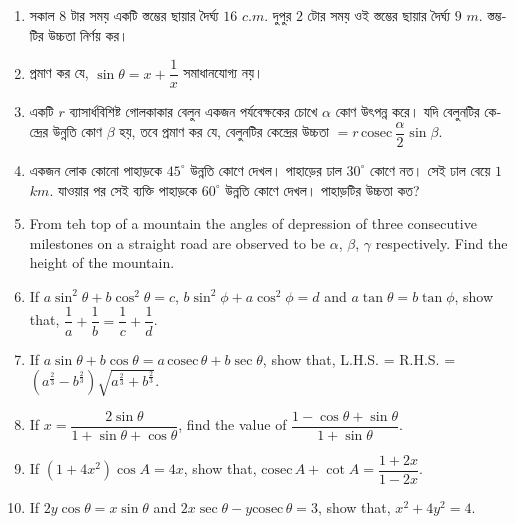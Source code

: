 \documentclass[11pt, a4paper]{article}
\begin{document}
\begin{enumerate}
	\item \textbengali{সকাল} $8$ \textbengali{টার সময় একটি স্তম্ভের ছায়ার দৈর্ঘ্য} $16$ $c.m.$ \textbengali{দুপুর} $2$ \textbengali{টোর সময় ওই স্তম্ভের ছায়ার দৈর্ঘ্য} $9$ $m.$ \textbengali{স্তম্ভটির উচ্চতা নির্ণয় কর।}
	
	\item \textbengali{প্রমাণ কর যে,} $\sin \theta = x + \dfrac{1}{x}$ \textbengali{সমাধানযোগ্য নয়।}
	
	\item \textbengali{একটি} $r$ \textbengali{ব্যাসার্ধবিশিষ্ট গোলকাকার বেলুন একজন পর্যবেক্ষকের চোখে} $\alpha$ \textbengali{কোণ উৎপন্ন করে। যদি বেলুনটির কেন্দ্রের উন্নতি কোণ} $\beta$ \textbengali{হয়, তবে প্রমাণ কর যে, বেলুনটির কেন্দ্রের উচ্চতা} $= r \, \mathrm{cosec\,} \dfrac{\alpha}{2} \sin \beta$.
	
	\item \textbengali{একজন লোক কোনো পাহাড়কে} $45^{\circ}$ \textbengali{উন্নতি কোণে দেখল। পাহাড়ের ঢাল} $30^{\circ}$ \textbengali{কোণে নত। সেই ঢাল বেয়ে} $1$ $km.$ \textbengali{যাওয়ার পর সেই ব্যক্তি পাহাড়কে} $60^{\circ}$ \textbengali{উন্নতি কোণে দেখল। পাহাড়টির উচ্চতা কত?}
	
	\item From teh top of a mountain the angles of depression of three consecutive milestones on a straight road are observed to be $\alpha$, $\beta$, $\gamma$ respectively. Find the height of the mountain.
	
	\item If $a \sin^2 \theta + b \cos^2 \theta = c$, $b \sin^2 \phi + a \cos^2 \phi = d$ and $a \tan \theta = b \tan \phi$, show that, $\dfrac{1}{a} + \dfrac{1}{b} = \dfrac{1}{c} + \dfrac{1}{d}$.
	
	\item If $a\sin \theta + b \cos \theta = a \, \mathrm{cosec}\, \theta + b \sec \theta$, show that, L.H.S. = R.H.S. = $\left( a^{\frac{2}{3}} - b^{\frac{2}{3}} \right) \sqrt{a^{\frac{2}{3}} + b^{\frac{2}{3}}}$.
	
	\item If $x = \dfrac{2 \sin \theta}{1 + \sin \theta + \cos \theta}$, find the value of $\dfrac{1-\cos \theta + \sin \theta}{1 + \sin \theta}$.
	
	\item If $\left( 1 + 4x^2 \right) \cos A = 4x$, show that, $\mathrm{cosec} \, A + \cot A = \dfrac{1+2x}{1-2x}$.
	
	\item If $2y \cos \theta = x \sin \theta$ and $2x \sec \theta - y \mathrm{cosec} \, \theta = 3$, show that, $x^2 + 4y^2 = 4$.
	

\end{enumerate}
\end{document}
